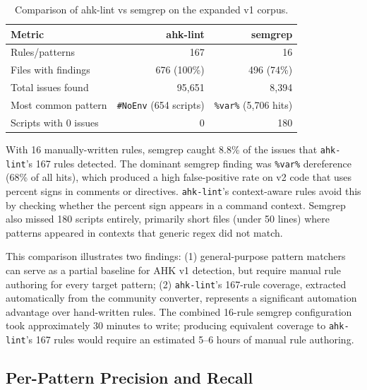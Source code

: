 \documentclass[11pt,a4paper]{article}
\begin{document}
\begin{enumerate}
\begin{table}[h]
\centering\small
\caption{Comparison of ahk-lint vs semgrep on the expanded v1 corpus.}
\label{tab:baseline}
\begin{tabular}{lrr}
\toprule
\textbf{Metric} & \textbf{ahk-lint} & \textbf{semgrep} \\
\midrule
Rules/patterns & 167 & 16 \\
Files with findings & 676 (100\%) & 496 (74\%) \\
Total issues found & 95,651 & 8,394 \\
Most common pattern & \texttt{\#NoEnv} (654 scripts) & \texttt{\%var\%} (5,706 hits) \\
Scripts with 0 issues & 0 & 180 \\
\bottomrule
\end{tabular}
\end{table}

With 16 manually-written rules, semgrep caught 8.8\% of the issues that \texttt{ahk-lint}'s 167 rules detected. The dominant semgrep finding was \texttt{\%var\%} dereference (68\% of all hits), which produced a high false-positive rate on v2 code that uses percent signs in comments or directives. \texttt{ahk-lint}'s context-aware rules avoid this by checking whether the percent sign appears in a command context. Semgrep also missed 180 scripts entirely, primarily short files (under 50 lines) where patterns appeared in contexts that generic regex did not match.

This comparison illustrates two findings: (1) general-purpose pattern matchers can serve as a partial baseline for AHK v1 detection, but require manual rule authoring for every target pattern; (2) \texttt{ahk-lint}'s 167-rule coverage, extracted automatically from the community converter, represents a significant automation advantage over hand-written rules. The combined 16-rule semgrep configuration took approximately 30 minutes to write; producing equivalent coverage to \texttt{ahk-lint}'s 167 rules would require an estimated 5--6 hours of manual rule authoring.

\subsection{Per-Pattern Precision and Recall}


\end{enumerate}
\end{document}
